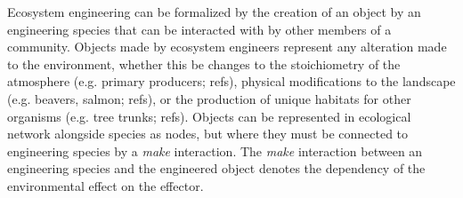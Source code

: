 \documentclass[9pt,twocolumn,twoside]{pnas-new}
\begin{document}
Ecosystem engineering can be formalized by the creation of an object by an engineering species that can be interacted with by other members of a community.
Objects made by ecosystem engineers represent any alteration made to the environment, whether this be changes to the stoichiometry of the atmosphere (e.g. primary producers; refs), physical modifications to the landscape (e.g. beavers, salmon; refs), or the production of unique habitats for other organisms (e.g. tree trunks; refs).
Objects can be represented in ecological network alongside species as nodes, but where they must be connected to engineering species by a \emph{make} interaction.
The \emph{make} interaction between an engineering species and the engineered object denotes the dependency of the environmental effect on the effector.













%
%
%
%
\end{document}
